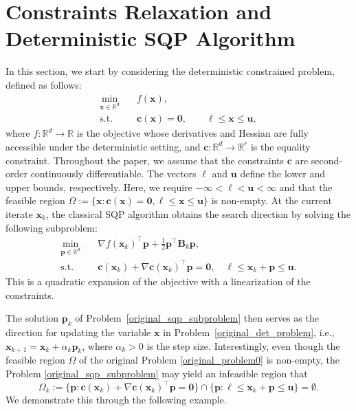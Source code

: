 \documentclass[aos]{imsart}
\numberwithin{equation}{section}
\theoremstyle{plain}
\begin{document}
\section{Constraints Relaxation and Deterministic SQP Algorithm}
\label{sec:constraint_relaxation}
In this section, we start by considering the deterministic constrained problem, defined as follows:
\begin{equation}
\label{original_det_problem}
    \begin{split}
        \min_{\bm{x} \in \mathbb{R}^{d}} & \hspace{1em} f(\bm{x}), \\
        \text{s.t.} & \hspace{1em}  \bm{c}(\bm{x}) = \bm{0}, \quad \hspace{1em} \bm{\ell} \leq \bm{x} \leq \bm{u},
    \end{split}
\end{equation}
where $f: \mathbb{R}^{d} \to \mathbb{R}$ is the objective whose derivatives and Hessian are fully accessible under the deterministic setting, and  $\bm{c}: \mathbb{R}^{d} \to \mathbb{R}^{r}$ is the equality constraint. Throughout the paper, we assume that the constraints $\bm{c}$ are second-order continuously differentiable. 
The vectors $\bm{\ell}$ and $\bm{u}$ define the lower and upper bounds, respectively.
Here, we require $-\infty < \bm{\ell} < \bm{u} < \infty$ and that the feasible region $\Omega := \{\bm{x}: \bm{c}(\bm{x}) = \bm{0}, \bm{\ell} \leq \bm{x} \leq \bm{u}\}$ is non-empty. 
At the current iterate $\bm{x}_k$, the classical SQP algorithm obtains the search direction
by solving the following subproblem:
\begin{equation}
\label{original_sqp_subproblem}
    \begin{split}
        \min_{\bm{p} \in \mathbb{R}^{d}} & \hspace{1em}  \nabla f(\bm{x}_k)^{\top}\bm{p}+ \frac{1}{2}\bm{p}^{\top}\bm{B}_k\bm{p},\\
        \text{s.t.} & \hspace{1em} \bm{c}(\bm{x}_k)+\nabla \bm{c}(\bm{x}_k)^{\top}\bm{p} = \bm{0},\quad \bm{\ell} \leq \bm{x}_k + \bm{p} \leq \bm{u} .
    \end{split}    
\end{equation}
This is a quadratic expansion of the objective with a linearization of the constraints.

The solution $\bm{p}_k$ of Problem~\eqref{original_sqp_subproblem} then serves as the direction for updating the variable $\bm{x}$ in Problem~\eqref{original_det_problem}, i.e., $\bm{x}_{k+1} = \bm{x}_{k} + \alpha_k \bm{p}_k$, where $\alpha_k >0$ is the step size.
Interestingly, even though the feasible region $\Omega$ of the original Problem \eqref{original_problem0} is non-empty, the Problem \eqref{original_sqp_subproblem} may yield an infeasible region that
\begin{equation*}
    \Omega_k := \{\bm{p}: \bm{c}(\bm{x}_k)+\nabla \bm{c}(\bm{x}_k)^{\top}\bm{p} = \bm{0}\} \cap \{\bm{p}: \bm{\ell} \leq \bm{x}_k + \bm{p} \leq \bm{u}\} = \emptyset.
\end{equation*}
We demonstrate this through the following example.
\end{document}
